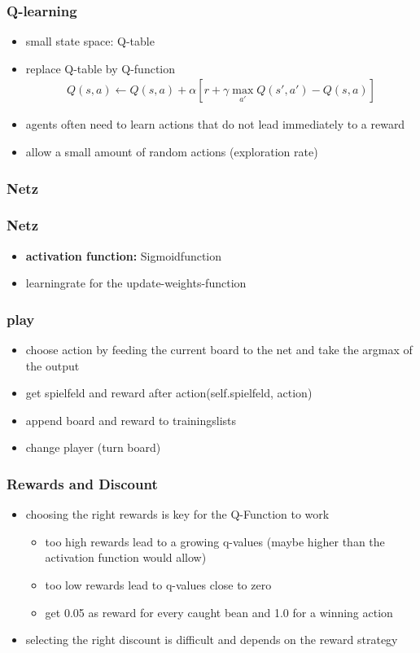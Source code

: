 \documentclass{beamer}
\begin{document}
  \begin{frame}
  \frametitle{Q-learning}
 \begin{itemize}
 \item small state space: Q-table
  \item replace Q-table by Q-function 
  \begin{align}
  Q(s,a) \leftarrow Q(s,a)+\alpha [r+\gamma \max_{a'} Q(s',a') -Q(s,a)]
  \end{align}
 \item agents often need to learn actions that do not lead immediately to a reward
 \item allow a small amount of random actions (exploration rate)
 \end{itemize}
 \end{frame}
 
 \begin{frame}
 \frametitle{Netz}

 \end{frame}
  \begin{frame}
 \frametitle{Netz}
\begin{itemize}
\item \textbf{activation function:} Sigmoidfunction
\item learningrate for the update-weights-function
\end{itemize}
 \end{frame}
 
 \begin{frame}
 \frametitle{play}
 \begin{itemize}
\item choose action by feeding the current board to the net and take the argmax of the output
\item get spielfeld and reward after action(self.spielfeld, action)
\item append board and reward to trainingslists
\item change player (turn board)
\end{itemize}
 \end{frame}
 
\begin{frame}
 \frametitle{Rewards and Discount}
 \begin{itemize}
 	\item choosing the right rewards is key for the Q-Function to work
 	\begin{itemize}
 		\item too high rewards lead to a growing q-values (maybe higher than the activation function would allow)
 		\item too low rewards lead to q-values close to zero
 		\item get 0.05 as reward for every caught bean and 1.0 for a winning action
 	\end{itemize}
 \item selecting the right discount is difficult and depends on the reward strategy
 \end{itemize}
\end{frame}
 
\end{document}
